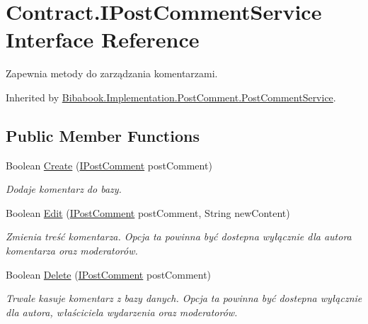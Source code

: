 \hypertarget{interface_contract_1_1_i_post_comment_service}{}\section{Contract.\+I\+Post\+Comment\+Service Interface Reference}
\label{interface_contract_1_1_i_post_comment_service}


Zapewnia metody do zarządzania komentarzami.  




Inherited by \hyperlink{class_bibabook_1_1_implementation_1_1_post_comment_1_1_post_comment_service}{Bibabook.\+Implementation.\+Post\+Comment.\+Post\+Comment\+Service}.

\subsection*{Public Member Functions}
\begin{DoxyCompactItemize}
\item 
Boolean \hyperlink{interface_contract_1_1_i_post_comment_service_a4f42588878a782bbd89fc5b57b1c48ae}{Create} (\hyperlink{interface_contract_1_1_i_post_comment}{I\+Post\+Comment} post\+Comment)
\begin{DoxyCompactList}\small\item\em Dodaje komentarz do bazy. \end{DoxyCompactList}\item 
Boolean \hyperlink{interface_contract_1_1_i_post_comment_service_a574a716ac04bdab96696dbb60e017d65}{Edit} (\hyperlink{interface_contract_1_1_i_post_comment}{I\+Post\+Comment} post\+Comment, String new\+Content)
\begin{DoxyCompactList}\small\item\em Zmienia treść komentarza. Opcja ta powinna być dostepna wyłącznie dla autora komentarza oraz moderatorów. \end{DoxyCompactList}\item 
Boolean \hyperlink{interface_contract_1_1_i_post_comment_service_a82dec9117da1559987ed270a2d0b5b81}{Delete} (\hyperlink{interface_contract_1_1_i_post_comment}{I\+Post\+Comment} post\+Comment)
\begin{DoxyCompactList}\small\item\em Trwale kasuje komentarz z bazy danych. Opcja ta powinna być dostepna wyłącznie dla autora, właściciela wydarzenia oraz moderatorów. \end{DoxyCompactList}\end{DoxyCompactItemize}


